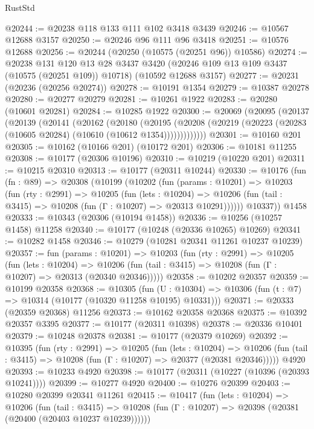 \begin{lexlean}{RustStd}
\begin{coremodule}
@20244 := @20238 @118 @133 @111 @102 @3418 @3439
@20246 := @10567 @12688 @3157
@20250 := @20246 @96 @111 @96 @3418
@20251 := @10576 @12688
@20256 := @20244 (@20250 (@10575 (@20251 @96)) @10586)
@20274 := @20238
    @131
    @120
    @13
    @28
    @3437
    @3420
    (@20246 @109 @13 @109 @3437 (@10575 (@20251 @109)) @10718)
    (@10592 @12688 @3157)
@20277 := @20231 (@20236 (@20256 @20274))
@20278 := @10191 @1354
@20279 := @10387 @20278
@20280 := @20277 @20279
@20281 := @10261 @1922
@20283 := @20280 (@10601 @20281)
@20284 := @10285 @1922
@20300 := @20069
    (@20095
      (@20137
        (@20139
          (@20141
            (@20162
              (@20180
                (@20195
                  (@20208 (@20219 (@20223 (@20283 (@10605 @20284) (@10610 (@10612 @1354)))))))))))))
@20301 := @10160 @201
@20305 := @10162 (@10166 @201) (@10172 @201)
@20306 := @10181 @11255
@20308 := @10177 (@20306 @10196)
@20310 := @10219 (@10220 @201)
@20311 := @10215 @20310
@20313 := @10177 (@20311 @10244)
@20330 := @10176
    (fun (fn : @89) =>
    @20308
      (@10199
        (@10202
          (fun (params : @10201) =>
          @10203
            (fun (rty : @2991) =>
            @10205
              (fun (lets : @10204) =>
              @10206 (fun (tail : @3415) => @10208 (fun (Γ : @10207) => @20313 @10291))))))
        @10337))
    @1458
@20333 := @10343 (@20306 (@10194 @1458))
@20336 := @10256 (@10257 @1458) @11258
@20340 := @10177 (@10248 (@20336 @10265) @10269)
@20341 := @10282 @1458
@20346 := @10279 (@10281 @20341 @11261 @10237 @10239)
@20357 := fun (params : @10201) =>
  @10203
    (fun (rty : @2991) =>
    @10205
      (fun (lets : @10204) =>
      @10206 (fun (tail : @3415) => @10208 (fun (Γ : @10207) => @20313 (@20340 @20346)))))
@20358 := @10202 @20357
@20359 := @10199 @20358
@20368 := @10305
    (fun (U : @10304) => @10306 (fun (t : @7) => @10314 (@10177 (@10320 @11258 @10195) @10331)))
@20371 := @20333 (@20359 @20368) @11256
@20373 := @10162 @20358 @20368
@20375 := @10392 @20357 @3395
@20377 := @10177 (@20311 @10398)
@20378 := @20336 @10401
@20379 := @10248 @20378
@20381 := @10177 (@20379 @10269)
@20392 := @10395
    (fun (rty : @2991) =>
    @10205
      (fun (lets : @10204) =>
      @10206 (fun (tail : @3415) => @10208 (fun (Γ : @10207) => @20377 (@20381 @20346)))))
    @4920
@20393 := @10233 @4920
@20398 := @10177 (@20311 (@10227 (@10396 (@20393 @10241))))
@20399 := @10277 @4920
@20400 := @10276 @20399
@20403 := @10280 @20399 @20341 @11261
@20415 := @10417
    (fun (lets : @10204) =>
    @10206
      (fun (tail : @3415) =>
      @10208 (fun (Γ : @10207) => @20398 (@20381 (@20400 (@20403 @10237 @10239))))))

\end{coremodule}
\end{lexlean}
